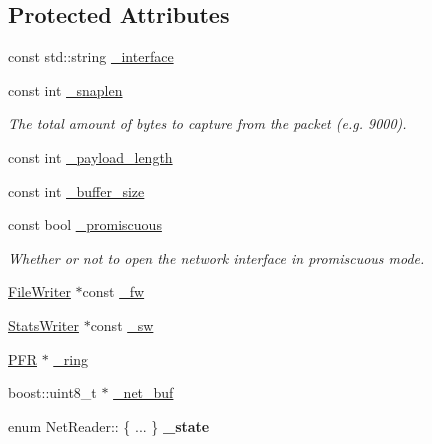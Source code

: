 \subsection*{Protected Attributes}
\begin{DoxyCompactItemize}
\item 
const std::string \hyperlink{class_net_reader_adcf200863f3126eaaa825d66de3b2ae6}{\_\-interface}
\item 
\hypertarget{class_net_reader_a315fd6f68c1e8aa65bfb1125e4a07568}{
const int \hyperlink{class_net_reader_a315fd6f68c1e8aa65bfb1125e4a07568}{\_\-snaplen}}
\label{class_net_reader_a315fd6f68c1e8aa65bfb1125e4a07568}

\begin{DoxyCompactList}\small\item\em The total amount of bytes to capture from the packet (e.g. 9000). \end{DoxyCompactList}\item 
const int \hyperlink{class_net_reader_aeee03720b22f775cdbee80a50c39453a}{\_\-payload\_\-length}
\item 
const int \hyperlink{class_net_reader_a2ae2988890c04fd26f274d039fb868d8}{\_\-buffer\_\-size}
\item 
\hypertarget{class_net_reader_aff7f135e9b67c9c0b91b65532c7178ac}{
const bool \hyperlink{class_net_reader_aff7f135e9b67c9c0b91b65532c7178ac}{\_\-promiscuous}}
\label{class_net_reader_aff7f135e9b67c9c0b91b65532c7178ac}

\begin{DoxyCompactList}\small\item\em Whether or not to open the network interface in promiscuous mode. \end{DoxyCompactList}\item 
\hyperlink{class_file_writer}{FileWriter} $\ast$const \hyperlink{class_net_reader_a5c447196aabbe2920be2bad71765ec31}{\_\-fw}
\item 
\hyperlink{class_stats_writer}{StatsWriter} $\ast$const \hyperlink{class_net_reader_a73d95d4fdb1065e26e2e8eed2b64d534}{\_\-sw}
\item 
\hyperlink{class_p_f_r}{PFR} $\ast$ \hyperlink{class_net_reader_acf0a225f9ec8f89f3b3b1e9ff761d916}{\_\-ring}
\item 
boost::uint8\_\-t $\ast$ \hyperlink{class_net_reader_afc35b98235d4d5479f755765d6bb1c97}{\_\-net\_\-buf}
\item 
\hypertarget{class_net_reader_a7a225465439801fc011e7a9d080f02ad}{
enum NetReader:: \{ ... \}  {\bfseries \_\-state}}
\label{class_net_reader_a7a225465439801fc011e7a9d080f02ad}

\end{DoxyCompactItemize}


